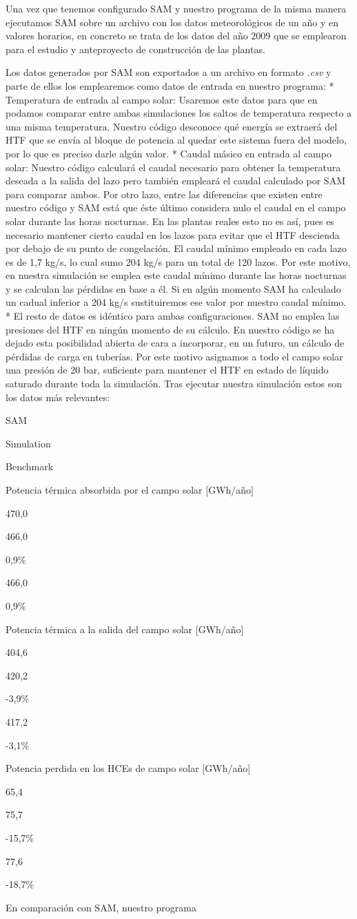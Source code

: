 Una vez que tenemos configurado SAM y nuestro programa de la misma manera ejecutamos SAM sobre un archivo con los datos meteorológicos de un año y en valores horarios, en concreto se trata de los datos del año 2009 que se emplearon para el estudio y anteproyecto de construcción de las plantas. 

Los datos generados por SAM son exportados a un archivo en formato \emph{.csv} y parte de ellos los emplearemos como datos de entrada en nuestro programa: 
* Temperatura de entrada al campo solar: Usaremos este datos para que en podamos comparar entre ambas simulaciones los saltos de temperatura respecto a una misma temperatura. Nuestro código desconoce qué energía se extraerá del HTF que se envía al bloque de potencia al quedar este sistema fuera del modelo, por lo que es preciso darle algún valor. 
* Caudal másico en entrada al campo solar: Nuestro código calculará el caudal necesario para obtener la temperatura deseada a la salida del lazo pero también empleará el caudal calculado por SAM para comparar ambos. Por otro lazo, entre las diferencias que existen entre nuestro código y SAM está que éste último considera nulo el caudal en el campo solar durante las horas nocturnas. En las plantas reales esto no es así, pues es necesario mantener cierto caudal en los lazos para evitar que el HTF descienda por debajo de su punto de congelación.  El caudal mínimo empleado en cada lazo es de 1,7 kg/s, lo cual sumo 204 kg/s para un total de 120 lazos. Por este motivo, en nuestra simulación se emplea este caudal mínimo durante las horas nocturnas y se calculan las pérdidas en base a él. Si en algún momento SAM ha calculado un cadual inferior a 204 kg/s sustituiremos ese valor por nuestro caudal mínimo. 
* El resto de datos es idéntico para ambas configuraciones. SAM no emplea las presiones del HTF en ningún momento de su cálculo. En nuestro código se ha dejado esta posibilidad abierta de cara a incorporar, en un futuro, un cálculo de pérdidas de carga en tuberías. Por este motivo asignamos a todo el campo solar una presión de 20 bar, suficiente para mantener el HTF en estado de líquido saturado durante toda la simulación. 
Tras ejecutar nuestra simulación estos son los datos más relevantes:

SAM

{Simulation}

{Benchmark}

Potencia térmica absorbida por el campo solar {[}GWh/año{]}

470,0

466,0

0,9\%

466,0

0,9\%

Potencia térmica a la salida del campo solar {[}GWh/año{]}

404,6

420,2

-3,9\%

417,2

-3,1\%

Potencia perdida en los HCEs de campo solar {[}GWh/año{]}

65,4

75,7

-15,7\%

77,6

-18,7\%

En comparación con SAM, nuestro programa
